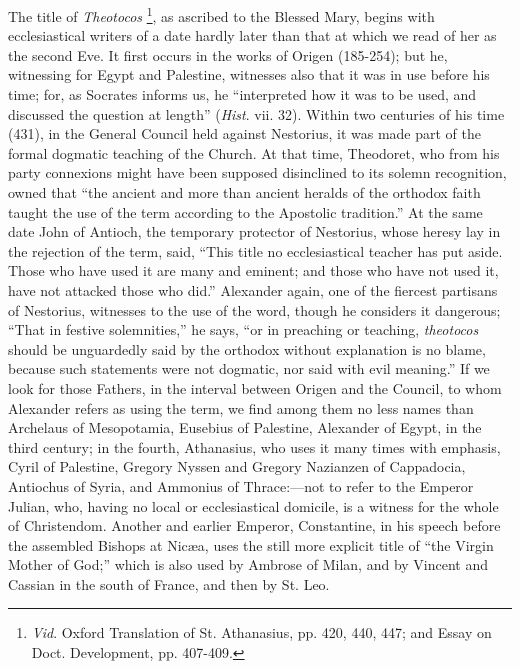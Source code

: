 The title of \emph{Theotocos} \footnote{\emph{Vid}.
Oxford Translation of St. Athanasius, pp. 420, 440, 447; and Essay on
Doct. Development, pp. 407-409.},
as ascribed to the Blessed Mary, begins with ecclesiastical writers of a
date hardly later than that at which we read of her as the second Eve.
It first occurs in the works of Origen (185-254); but he, witnessing for
Egypt and Palestine, witnesses also that it was in use before his time;
for, as Socrates informs us, he ``interpreted how it was to be used,
and discussed the question at length'' (\emph{Hist}. vii. 32).
Within two centuries of his time (431), in the General Council held
against Nestorius, it was made part of the formal dogmatic teaching of
the Church. At that time, Theodoret, who from his party connexions might
have been supposed disinclined to its solemn recognition, owned that
``the ancient and more than ancient heralds of the orthodox faith
taught the use of the term according to the Apostolic tradition.''
At the same date John of Antioch, the temporary protector of Nestorius,
whose heresy lay in the rejection of the term, said, ``This title no
ecclesiastical teacher has put aside. Those who have used it are many
and eminent; and those who have not used it, have not attacked those who
did.'' Alexander again, one of the fiercest partisans of Nestorius,
witnesses to the use of the word, though he considers it dangerous;
``That in festive solemnities,'' he says, ``or in preaching
or teaching, \emph{theotocos} should be unguardedly said by the orthodox
without explanation is no blame, because such statements were not
dogmatic, nor said with evil meaning.'' If we look for those
Fathers, in the interval between Origen and the Council, to whom
Alexander refers as using the term, we find among them no less names
than Archelaus of Mesopotamia, Eusebius of Palestine, Alexander of
Egypt, in the third century; in the fourth, Athanasius, who uses it many
times with emphasis, Cyril of Palestine, Gregory Nyssen and Gregory
Nazianzen of Cappadocia, Antiochus of Syria, and Ammonius of Thrace:—not
to refer to the Emperor Julian, who, having no local or ecclesiastical
domicile, is a witness for the whole of Christendom. Another and earlier
Emperor, Constantine, in his speech before the assembled Bishops at
Nicæa, uses the still more explicit title of ``the Virgin Mother of
God;'' which is also used by Ambrose of Milan, and by Vincent and
Cassian in the south of France, and then by St. Leo.

